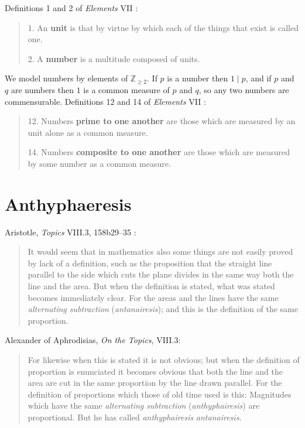 \documentclass{article}
\begin{document}
Definitions 1 and 2 of {\em Elements} VII \cite[p.~277]{euclidII}:

\begin{quote}
1. An \textbf{unit} is that by virtue by which each of the things
that exist is called one.

2. A \textbf{number} is a multitude composed of units.
\end{quote}

We model numbers by elements of $\mathbb{Z}_{\geq 2}$. 
If $p$ is a number then $1 \mid p$, and 
if $p$ and $q$ are numbers then $1$ is a common measure of $p$ and $q$, so
any two numbers are commensurable.
Definitions 12 and 14 of {\em Elements} VII \cite[p.~278]{euclidII}:

\begin{quote}
12. Numbers \textbf{prime to one another}
are those which are measured by an unit alone as a common measure.

14. Numbers \textbf{composite to one another} are those 
which are measured by some number as a common measure.
\end{quote}






\section{Anthyphaeresis}
Aristotle, {\em Topics} VIII.3, 158b29--35 \cite[pp.~506--507]{LCL335}:

\begin{quote}
It would seem that in mathematics also some things
are not easily proved by lack of a definition, such as
the proposition that the straight line parallel to the
side which cuts the plane divides in the same way
both the line and the area. But when the definition
is stated, what was stated becomes immediately clear.
For the areas and the lines have the same {\em alternating subtraction}
({\em antanairesis}); and this is the definition of
the same proportion.
\end{quote}

Alexander of Aphrodisias, {\em On the Topics}, VIII.3:

\begin{quote}
For likewise when this is stated it is not obvious;
but when the definition of proportion is enunciated it
becomes obvious that both the line and the area are
cut in the same proportion by the line drawn parallel.
For the definition of proportions which those of old
time used is this: Magnitudes which have the same
{\em alternating subtraction} ({\em anthyphairesis}) are proportional.
But he has called {\em anthyphairesis} {\em antanairesis}.
\end{quote}
\end{document}
